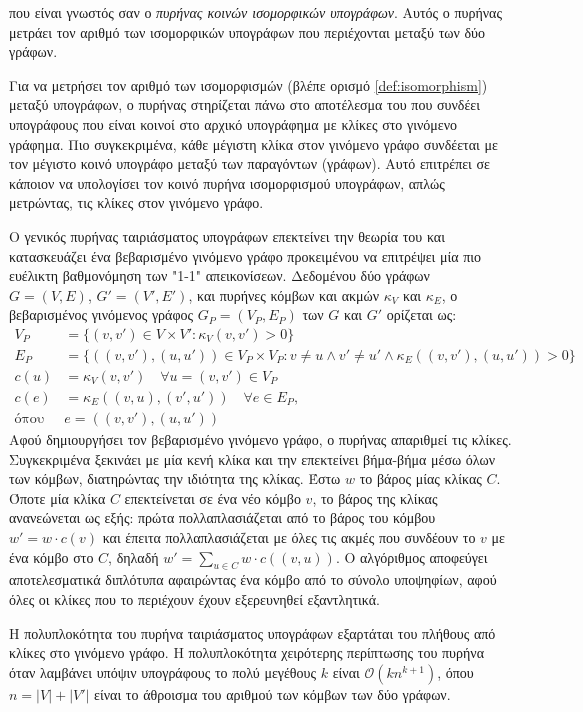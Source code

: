 που είναι γνωστός σαν ο \textit{πυρήνας κοινών ισομορφικών υπογράφων}.
Αυτός ο πυρήνας μετράει τον αριθμό των ισομορφικών υπογράφων που περιέχονται μεταξύ των δύο γράφων.\par
Για να μετρήσει τον αριθμό των ισομορφισμών (βλέπε ορισμό \ref{def:isomorphism}) μεταξύ υπογράφων, ο πυρήνας στηρίζεται πάνω στο αποτέλεσμα του  \cite{levi1973note} που συνδέει υπογράφους που είναι κοινοί στο αρχικό υπογράφημα με κλίκες στο γινόμενο γράφημα.
Πιο συγκεκριμένα, κάθε μέγιστη κλίκα στον γινόμενο γράφο συνδέεται με τον μέγιστο κοινό υπογράφο μεταξύ των παραγόντων (γράφων).
Αυτό επιτρέπει σε κάποιον να υπολογίσει τον κοινό πυρήνα ισομορφισμού υπογράφων, απλώς μετρώντας, τις κλίκες στον γινόμενο γράφο.\par
Ο γενικός πυρήνας ταιριάσματος υπογράφων επεκτείνει την θεωρία του  και κατασκευάζει ένα βεβαρισμένο γινόμενο γράφο προκειμένου να επιτρέψει μία πιο ευέλικτη βαθμονόμηση των "1-1" απεικονίσεων.
Δεδομένου δύο γράφων $G=(V,E)$, $G'=(V',E')$, και πυρήνες κόμβων και ακμών $\kappa_V$ και $\kappa_E$, ο βεβαρισμένος γινόμενος γράφος $G_P=(V_P, E_P)$ των $G$ και $G'$ ορίζεται ως:
\begin{equation}
    \begin{split}
        V_P &= \{ (v,v') \in V \times V' : \kappa_V(v,v') > 0 \} \\
        E_P &= \{ ((v,v'),(u,u')) \in V_P \times V_P : v \neq u \wedge v' \neq u' \wedge \kappa_E((v,v'),(u,u')) > 0 \} \\
        c(u) &= \kappa_V(v,v') \quad \forall u=(v,v') \in V_P \\
        c(e) &= \kappa_E((v,u),(v',u')) \quad \forall e \in E_P, \\
        \text{όπου } &e=((v,v'),(u,u')) 
    \end{split}
\end{equation}
Αφού δημιουργήσει τον βεβαρισμένο γινόμενο γράφο, ο πυρήνας απαριθμεί τις κλίκες.
Συγκεκριμένα ξεκινάει με μία κενή κλίκα και την επεκτείνει βήμα-βήμα μέσω όλων των κόμβων, διατηρώντας την ιδιότητα της κλίκας. 
Έστω $w$ το βάρος μίας κλίκας $C$.
Όποτε μία κλίκα $C$ επεκτείνεται σε ένα νέο κόμβο $v$, το βάρος της κλίκας ανανεώνεται ως εξής: πρώτα πολλαπλασιάζεται από το βάρος του κόμβου $w' = w \cdot c(v)$ και έπειτα πολλαπλασιάζεται με όλες τις ακμές που συνδέουν το $v$ με ένα κόμβο στο $C$, δηλαδή $w' = \sum_{u \in C} w \cdot c((v,u))$.
Ο αλγόριθμος αποφεύγει αποτελεσματικά διπλότυπα αφαιρώντας ένα κόμβο από το σύνολο υποψηφίων, αφού όλες οι κλίκες που το περιέχουν έχουν εξερευνηθεί εξαντλητικά.\par
Η πολυπλοκότητα του πυρήνα ταιριάσματος υπογράφων εξαρτάται του πλήθους από κλίκες στο γινόμενο γράφο.
Η πολυπλοκότητα χειρότερης περίπτωσης του πυρήνα όταν λαμβάνει υπόψιν υπογράφους το πολύ μεγέθους $k$ είναι $\mathcal{O}(kn^{k+1})$, όπου $n=|V|+|V'|$ είναι το άθροισμα του αριθμού των κόμβων των δύο γράφων.

